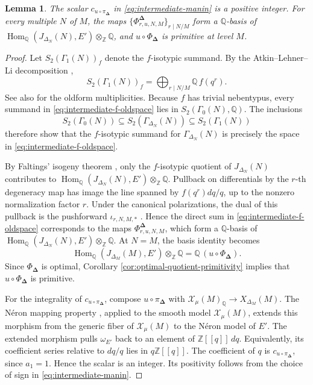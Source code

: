 \documentclass[12pt, letterpaper]{amsart}
\newtheorem{lemma}[theorem]{Lemma}
\theoremstyle{definition}
\theoremstyle{remark}
\newcommand{\Q}{\mathbb Q}
\newcommand{\Z}{\mathbb Z}
\newcommand{\Hom}{\operatorname{Hom}}
\numberwithin{equation}{section}
\begin{document}
\begin{lemma}\label{lem:intermediate-old-hom}
The scalar \(c_{u\circ\pi_{\boldsymbol\Delta}}\) in
\eqref{eq:intermediate-manin}
is a positive integer. For every multiple \(N\) of \(M\), the maps
\(\{\Phi^{\boldsymbol\Delta}_{r,u,N,M}\}_{r\mid N/M}\) form a \(\Q\)-basis of
\(\Hom_\Q(J_{\Delta_N}(N),E')\otimes_\Z\Q\), and
\(u\circ\Phi_{\boldsymbol\Delta}\) is primitive at level \(M\).
\end{lemma}

\begin{proof}
Let \(S_2(\Gamma_1(N))_f\) denote the \(f\)-isotypic summand.
By the Atkin--Lehner--Li decomposition \cite{Li},
\begin{equation}\label{eq:intermediate-f-oldspace}
        S_2(\Gamma_1(N))_f={}
        \bigoplus_{r\mid N/M}\Q\,f(q^r).
\end{equation}
See also \cite{DiamondShurman} for the oldform multiplicities. Because
\(f\) has trivial nebentypus, every summand in
\eqref{eq:intermediate-f-oldspace} lies in \(S_2(\Gamma_0(N),\Q)\). The
inclusions
\[
 S_2(\Gamma_0(N))\subseteq S_2(\Gamma_{\Delta_N}(N))
 \subseteq S_2(\Gamma_1(N))
\]
therefore show that the \(f\)-isotypic summand for
\(\Gamma_{\Delta_N}(N)\) is precisely the space in
\eqref{eq:intermediate-f-oldspace}.

By Faltings' isogeny theorem \cite{Faltings}, only the \(f\)-isotypic quotient
of \(J_{\Delta_N}(N)\) contributes to
\(\Hom_\Q(J_{\Delta_N}(N),E')\otimes_\Z\Q\). Pullback on differentials by the
\(r\)-th degeneracy map has image the line spanned by \(f(q^r)dq/q\), up to the
nonzero normalization factor \(r\). Under the canonical polarizations, the
dual of this pullback is the pushforward
\(\iota_{r,N,M,*}\)
\cite{ConradEdixhovenStein}. Hence the direct sum in
\eqref{eq:intermediate-f-oldspace} corresponds to the maps
\(\Phi^{\boldsymbol\Delta}_{r,u,N,M}\), which form a \(\Q\)-basis of
\(\Hom_\Q(J_{\Delta_N}(N),E')\otimes_\Z\Q\). At \(N=M\), the basis identity becomes
\[
 \Hom_\Q(J_{\Delta_M}(M),E')\otimes_\Z\Q
 =\Q\,(u\circ\Phi_{\boldsymbol\Delta}).
\]
Since \(\Phi_{\boldsymbol\Delta}\) is optimal, Corollary
\ref{cor:optimal-quotient-primitivity} implies that
\(u\circ\Phi_{\boldsymbol\Delta}\) is primitive.

For the integrality of \(c_{u\circ\pi_{\boldsymbol\Delta}}\), compose
\(u\circ\pi_{\boldsymbol\Delta}\) with
\(\mathcal X_\mu(M)_\Q\to X_{\Delta_M}(M)\). The N\'eron mapping property
\cite{BLR}, applied to the smooth model
\(\mathcal X_\mu(M)\), extends this morphism from the generic fiber of
\(\mathcal X_\mu(M)\) to the N\'eron model of \(E'\). The extended morphism
pulls \(\omega_{E'}\) back to an element of \(\Z[[q]]\,dq\). Equivalently, its coefficient series
relative to \(dq/q\) lies in \(q\Z[[q]]\). The coefficient of \(q\) is
\(c_{u\circ\pi_{\boldsymbol\Delta}}\), since \(a_1=1\). Hence the scalar is an
integer. Its positivity follows from the choice
of sign in \eqref{eq:intermediate-manin}.
\end{proof}
\end{document}
